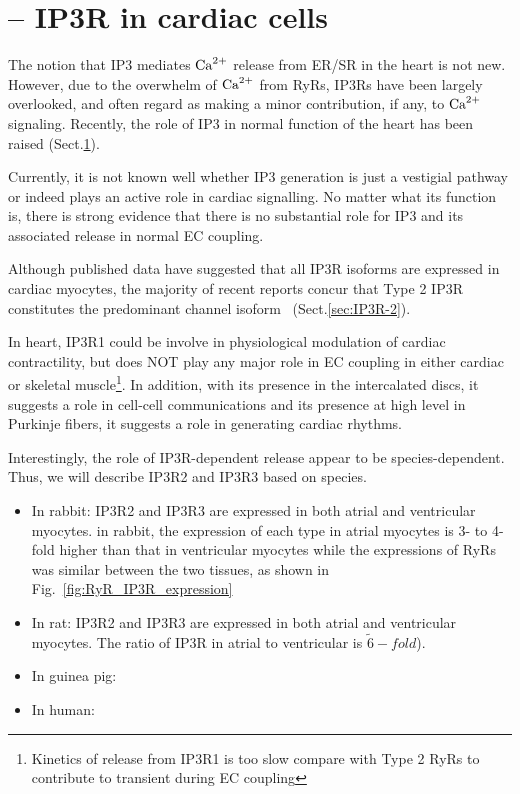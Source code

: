 \section{-- IP3R in cardiac cells}
\label{sec:IP3R_cardiac}
\label{sec:IP3R-heart}


The notion that IP3 mediates ${\text{Ca}^{2+}}$ release from ER/SR in the heart is not new.
However, due to the overwhelm of ${\text{Ca}^{2+}}$ from RyRs, IP3Rs have been largely
overlooked, and often regard as making a minor contribution, if any, to
 ${\text{Ca}^{2+}}$ signaling.
Recently, the role of IP3 in normal function of the heart has been raised
\citep{hund2008} (Sect.\ref{sec:IP3R_cardiac}).

Currently, it is not known well whether IP3 generation is just a vestigial
pathway or indeed plays an active role in cardiac signalling. No matter what its
function is, there is strong evidence that there is no substantial role for IP3
and its associated  release in normal EC
coupling\citep{woodcock2005ip3}.


Although published data have suggested that all IP3R isoforms are
expressed in cardiac myocytes, the majority of recent reports concur
that Type 2 IP3R constitutes the predominant channel
isoform~\citep{li2005et1} (Sect.\ref{sec:IP3R-2}). 

In heart, IP3R1 could be involve in physiological modulation of cardiac
contractility, but does NOT play any major role in EC coupling in either cardiac
or skeletal muscle\footnote{Kinetics of  release from IP3R1 is too
slow compare with Type 2 RyRs to contribute to  transient during EC
coupling}.
In addition, with its presence in the intercalated discs, it suggests a role in
cell-cell communications and its presence at high level in Purkinje fibers, it
suggests a role in generating cardiac rhythms.

Interestingly, the role of IP3R-dependent  release appear to be
species-dependent\citep{domeier2007ird}. Thus, we will describe IP3R2 and IP3R3
based on species.

\begin{itemize}
\item In rabbit: IP3R2 and IP3R3 are expressed in both atrial and
  ventricular myocytes\citep{domeier2007ird}.  in rabbit, the
  expression of each type in atrial myocytes is 3- to 4-fold higher
  than that in ventricular myocytes while the expressions of RyRs was
  similar between the two tissues, as shown in
  Fig.~\ref{fig:RyR_IP3R_expression}

\item In rat: IP3R2 and IP3R3 are expressed in both atrial and
  ventricular myocytes. The ratio of IP3R in atrial to ventricular is
  $\tilde 6-fold$)\citep{lipp2000fip3}.

\item In guinea pig: 

\item In human:

\end{itemize}


